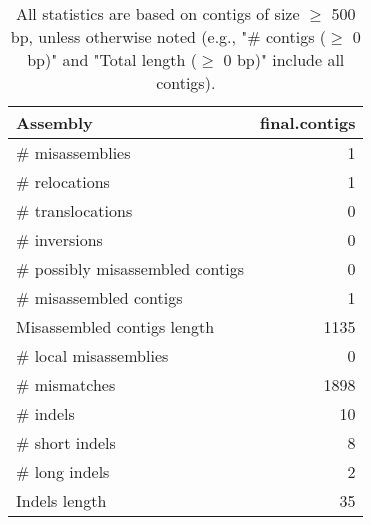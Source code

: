\documentclass[12pt,a4paper]{article}
\begin{document}
\begin{table}[ht]
\begin{center}
\caption{All statistics are based on contigs of size $\geq$ 500 bp, unless otherwise noted (e.g., "\# contigs ($\geq$ 0 bp)" and "Total length ($\geq$ 0 bp)" include all contigs).}
\begin{tabular}{|l*{1}{|r}|}
\hline
Assembly & final.contigs \\ \hline
\# misassemblies & 1 \\ \hline
\hspace{5mm}\# relocations & 1 \\ \hline
\hspace{5mm}\# translocations & 0 \\ \hline
\hspace{5mm}\# inversions & 0 \\ \hline
\# possibly misassembled contigs & 0 \\ \hline
\# misassembled contigs & 1 \\ \hline
Misassembled contigs length & 1135 \\ \hline
\# local misassemblies & 0 \\ \hline
\# mismatches & 1898 \\ \hline
\# indels & 10 \\ \hline
\hspace{5mm}\# short indels & 8 \\ \hline
\hspace{5mm}\# long indels & 2 \\ \hline
Indels length & 35 \\ \hline
\end{tabular}
\end{center}
\end{table}
\end{document}
